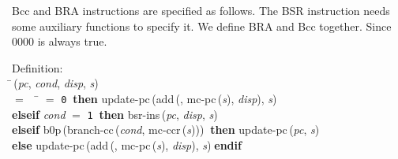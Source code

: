  Bcc and BRA instructions are specified as follows.  The BSR
 instruction needs
 some auxiliary functions to specify it.
 We define BRA and Bcc together.
 Since 0000 is always true.
\begin{tabbing}{\sc Definition}: \\  
\=\,({\it{pc\/}}, {\it{cond\/}}, {\it{disp\/}}, {\it{s\/}}) \\ 
$=$$\;\;\;\;$\= $=$ {\tt{0}}$\;\;${\bf then }{\rm{update-pc}}\,({\rm{add}}\,({}, {\rm{mc-pc}}\,({\it{s\/}}), {\it{disp\/}}), {\it{s\/}}) \\ 
{\bf elseif }{\it{cond\/}} $=$ {\tt{1}}$\;\;${\bf then }{\rm{bsr-ins}}\,({\it{pc\/}}, {\it{disp\/}}, {\it{s\/}}) \\ 
{\bf elseif }{\rm{b0p}}\,({\rm{branch-cc}}\,({\it{cond\/}}, {\rm{mc-ccr}}\,({\it{s\/}})))$\;\;${\bf then }{\rm{update-pc}}\,({\it{pc\/}}, {\it{s\/}}) \\ 
{\bf else }{\rm{update-pc}}\,({\rm{add}}\,({}, {\rm{mc-pc}}\,({\it{s\/}}), {\it{disp\/}}), {\it{s\/}})$\;${\bf  endif}\-\-
\end{tabbing}

